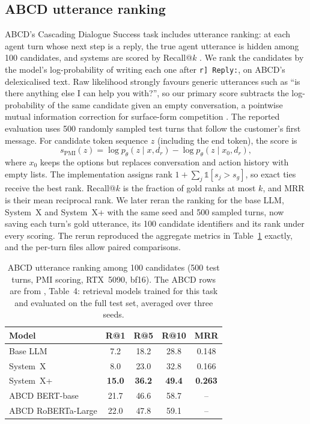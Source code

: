 \documentclass[11pt]{article}
\newcommand{\sysplus}{System~X+}
\begin{document}
\subsection{ABCD utterance ranking}
ABCD's Cascading Dialogue Success task includes utterance ranking: at each agent turn whose next step is a reply, the true agent utterance is hidden among 100 candidates, and systems are scored by Recall@$k$ \citep{chen2021abcd}. We rank the candidates by the model's log-probability of writing each one after \texttt{r] Reply:}, on ABCD's delexicalised text. Raw likelihood strongly favours generic utterances such as ``is there anything else I can help you with?'', so our primary score subtracts the log-probability of the same candidate given an empty conversation, a pointwise mutual information correction for surface-form competition \citep{holtzman2021surface}. The reported evaluation uses 500 randomly sampled test turns that follow the customer's first message. For candidate token sequence $z$ (including the end token), the score is
\begin{equation}
s_{\mathrm{PMI}}(z)=\log p_\theta(z\mid x,d_r)-\log p_\theta(z\mid x_0,d_r),
\end{equation}
where $x_0$ keeps the options but replaces conversation and action history with empty lists. The implementation assigns rank $1+\sum_j\mathbb{1}[s_j>s_g]$, so exact ties receive the best rank. Recall@$k$ is the fraction of gold ranks at most $k$, and MRR is their mean reciprocal rank.
We later reran the ranking for the base LLM, System~X and \sysplus{} with the same seed and 500 sampled turns, now saving each turn's gold utterance, its 100 candidate identifiers and its rank under every scoring. The rerun reproduced the aggregate metrics in Table~\ref{tab:rank} exactly, and the per-turn files allow paired comparisons.

\begin{table}[t]
\centering
\caption{ABCD utterance ranking among 100 candidates (500 test turns, PMI scoring, RTX~5090, bf16). The ABCD rows are from \citet{chen2021abcd}, Table~4: retrieval models trained for this task and evaluated on the full test set, averaged over three seeds.}
\label{tab:rank}
\small
\begin{tabular}{lcccc}
\toprule
Model & R@1 & R@5 & R@10 & MRR \\
\midrule
Base LLM & 7.2 & 18.2 & 28.8 & 0.148 \\
System~X & 8.0 & 23.0 & 32.8 & 0.166 \\
\sysplus{} & \textbf{15.0} & \textbf{36.2} & \textbf{49.4} & \textbf{0.263} \\
\midrule
ABCD BERT-base & 21.7 & 46.6 & 58.7 & -- \\
ABCD RoBERTa-Large & 22.0 & 47.8 & 59.1 & -- \\
\bottomrule
\end{tabular}
\end{table}
\end{document}
